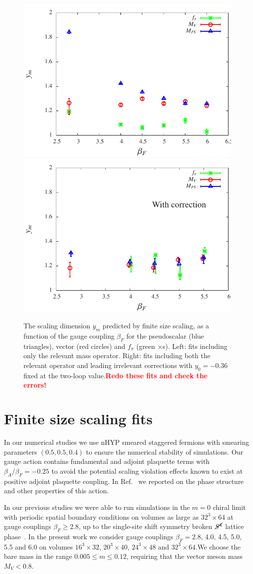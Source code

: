 \documentclass[aps,prl,twocolumn,]{revtex4}  %
\newcommand{\X}{\ensuremath{\!\times\!} }
\newcommand{\Sb}{\ensuremath{\cancel{S^4}} }
\newcommand{\refcite}[1]{Ref.~\cite{#1}}
\newcommand{\TODO}[1]{\textcolor{red}{{\bf #1}}}
\begin{document}
\begin{figure}[tbp]
\centering
  \includegraphics[width=0.45\linewidth]{ym_c0} \hfill
  \includegraphics[width=0.45\linewidth]{ym}
   \caption{\label{fig:scaling_exp} The scaling dimension $y_m$ predicted by finite size scaling, as a function of the gauge coupling $\beta_F$ for the pseudoscalar (blue triangles), vector (red circles) and $f_\pi$ (green $\times$s).  Left: fits including only the relevant mass operator.  Right: fits including both the relevant operator and leading irrelevant corrections with $y_0=-0.36$ fixed at the two-loop value.\TODO{Redo these fits and cheek the errors!}}
\end{figure}





\section{Finite size scaling fits}
In our numerical studies we use nHYP smeared staggered fermions with smearing parameters $(0.5,0.5,0.4)$ to ensure the numerical stability of simulations.
Our gauge action contains fundamental and adjoint plaquette terms with $\beta_A/\beta_F=-0.25$ to avoid the potential scaling violation effects known to exist at positive adjoint plaquette coupling.
In \refcite{Cheng:2011ic} we reported on the phase structure and other properties of this action.

In our previous studies we were able to run simulations in the $m=0$ chiral limit with periodic spatial boundary conditions on volumes as large as $32^3\X64$ at gauge couplings $\beta_F\ge2.8$, up to the single-site shift symmetry broken  \Sb lattice phase~\cite{Hasenfratz:2013uha}.
In the present work we consider gauge couplings $\beta_F=2.8$, 4.0, 4.5, 5.0, 5.5 and 6.0 on volumes $16^3\X32$, $20^3\X40$, $24^3\X48$ and $32^3\X64$.We choose the bare mass in the range $0.005 \leq m \leq 0.12$, requiring that the vector meson mass $M_V < 0.8$.
\end{document}
